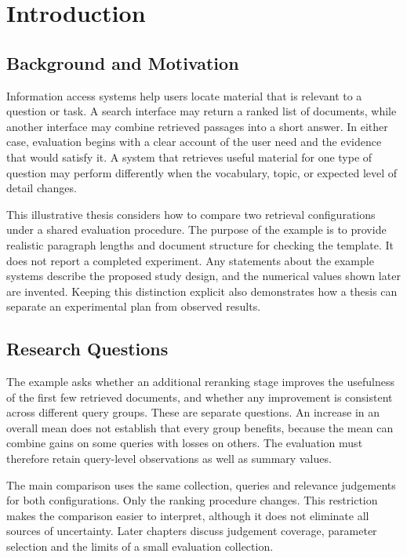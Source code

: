 \chapter{Introduction}
\label{sec:introduction}

\section{Background and Motivation}
Information access systems help users locate material that is relevant to a
question or task. A search interface may return a ranked list of documents,
while another interface may combine retrieved passages into a short answer.
In either case, evaluation begins with a clear account of the user need and
the evidence that would satisfy it. A system that retrieves useful material
for one type of question may perform differently when the vocabulary, topic,
or expected level of detail changes.

This illustrative thesis considers how to compare two retrieval configurations
under a shared evaluation procedure. The purpose of the example is to provide
realistic paragraph lengths and document structure for checking the template.
It does not report a completed experiment. Any statements about the example
systems describe the proposed study design, and the numerical values shown
later are invented. Keeping this distinction explicit also demonstrates how
a thesis can separate an experimental plan from observed results.

\section{Research Questions}
The example asks whether an additional reranking stage improves the usefulness
of the first few retrieved documents, and whether any improvement is consistent
across different query groups. These are separate questions. An increase in an
overall mean does not establish that every group benefits, because the mean
can combine gains on some queries with losses on others. The evaluation must
therefore retain query-level observations as well as summary values.

The main comparison uses the same collection, queries and relevance judgements
for both configurations. Only the ranking procedure changes. This restriction
makes the comparison easier to interpret, although it does not eliminate all
sources of uncertainty. Later chapters discuss judgement coverage, parameter
selection and the limits of a small evaluation collection.

